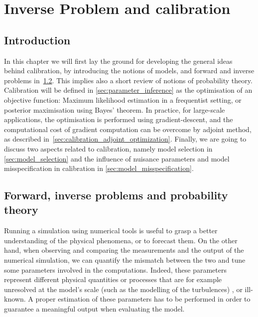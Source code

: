 \documentclass[../../Main_ManuscritThese.tex]{subfiles}
\begin{document}
\chapter{Inverse Problem and calibration}
\label{chap:inverse_problem}
\minitoc
\newpage
\subfileLocal{\pagestyle{contentStyle}}

\section{Introduction}
\label{sec:intro_chap2}
In this chapter we will first lay the ground for developing the
general ideas behind calibration, by introducing the notions of
models, and forward and inverse problems
in~\cref{sec:forward_inverse_problem_proba_theory}. This implies also
a short review of notions of probability theory. Calibration will be
defined in \cref{sec:parameter_inference} as the optimisation of an
objective function: Maximum likelihood estimation in a frequentist
setting, or posterior maximisation using Bayes' theorem. In practice,
for large-scale applications, the optimisation is performed using
gradient-descent, and the computational cost of gradient computation
can be overcome by adjoint method, as described
in~\cref{sec:calibration_adjoint_optimization}. Finally, we are going
to discuss two aspects related to calibration, namely model selection
in \cref{sec:model_selection} and the influence of nuisance parameters
and model misspecification in calibration in
\cref{sec:model_misspecification}.


\section{Forward, inverse problems and probability theory}
\label{sec:forward_inverse_problem_proba_theory}
Running a simulation using numerical tools is useful to grasp a better
understanding of the physical phenomena, or to forecast them. On the
other hand, when observing and comparing the measurements and the
output of the numerical simulation, we can quantify the mismatch
between the two and tune some parameters involved in the
computations. Indeed, these parameters represent different physical
quantities or processes that are for example unresolved at the model's
scale (such as the modelling of the
turbulences)%
, or ill-known. A proper estimation of these parameters has to be
performed in order to guarantee a meaningful output when evaluating
the model.
\end{document}

